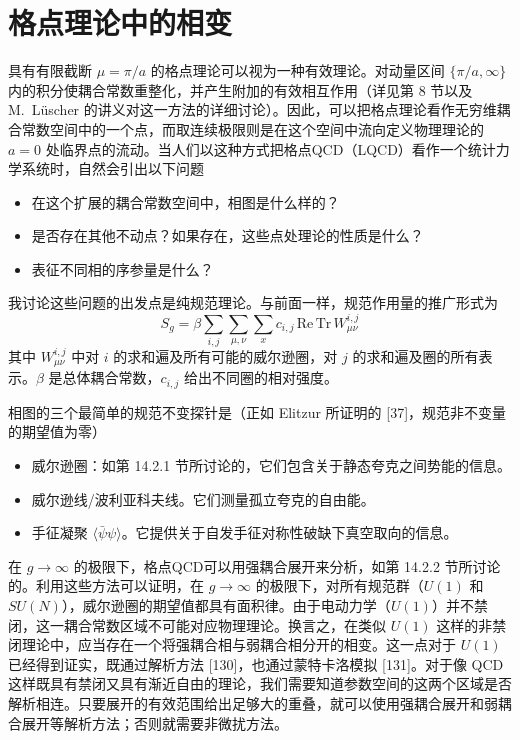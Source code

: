 
\chapter{格点理论中的相变}

具有有限截断 $\mu = \pi/a$ 的格点理论可以视为一种有效理论。对动量区间 $\{\pi/a, \infty\}$ 内的积分使耦合常数重整化，并产生附加的有效相互作用（详见第 8 节以及 M.~L\"uscher 的讲义对这一方法的详细讨论）。因此，可以把格点理论看作无穷维耦合常数空间中的一个点，而取连续极限则是在这个空间中流向定义物理理论的 $a = 0$ 处临界点的流动。当人们以这种方式把格点QCD（LQCD）看作一个统计力学系统时，自然会引出以下问题
\begin{itemize}
\item 在这个扩展的耦合常数空间中，相图是什么样的？
\item 是否存在其他不动点？如果存在，这些点处理论的性质是什么？
\item 表征不同相的序参量是什么？
\end{itemize}

我讨论这些问题的出发点是纯规范理论。与前面一样，规范作用量的推广形式为
\begin{equation}
S_g = \beta \sum_{i,j} \sum_{\mu,\nu} \sum_x c_{i,j}\, \mathrm{Re}\, \mathrm{Tr}\, W^{i,j}_{\mu\nu}
\end{equation}
其中 $W^{i,j}_{\mu\nu}$ 中对 $i$ 的求和遍及所有可能的威尔逊圈，对 $j$ 的求和遍及圈的所有表示。$\beta$ 是总体耦合常数，$c_{i,j}$ 给出不同圈的相对强度。

相图的三个最简单的规范不变探针是（正如 Elitzur 所证明的 [37]，规范非不变量的期望值为零）
\begin{itemize}
\item 威尔逊圈：如第 14.2.1 节所讨论的，它们包含关于静态夸克之间势能的信息。
\item 威尔逊线/波利亚科夫线。它们测量孤立夸克的自由能。
\item 手征凝聚 $\langle \bar{\psi}\psi\rangle$。它提供关于自发手征对称性破缺下真空取向的信息。
\end{itemize}

在 $g \to \infty$ 的极限下，格点QCD可以用强耦合展开来分析，如第 14.2.2 节所讨论的。利用这些方法可以证明，在 $g \to \infty$ 的极限下，对所有规范群（$U(1)$ 和 $SU(N)$），威尔逊圈的期望值都具有面积律。由于电动力学（$U(1)$）并不禁闭，这一耦合常数区域不可能对应物理理论。换言之，在类似 $U(1)$ 这样的非禁闭理论中，应当存在一个将强耦合相与弱耦合相分开的相变。这一点对于 $U(1)$ 已经得到证实，既通过解析方法 [130]，也通过蒙特卡洛模拟 [131]。对于像 QCD 这样既具有禁闭又具有渐近自由的理论，我们需要知道参数空间的这两个区域是否解析相连。只要展开的有效范围给出足够大的重叠，就可以使用强耦合展开和弱耦合展开等解析方法；否则就需要非微扰方法。

